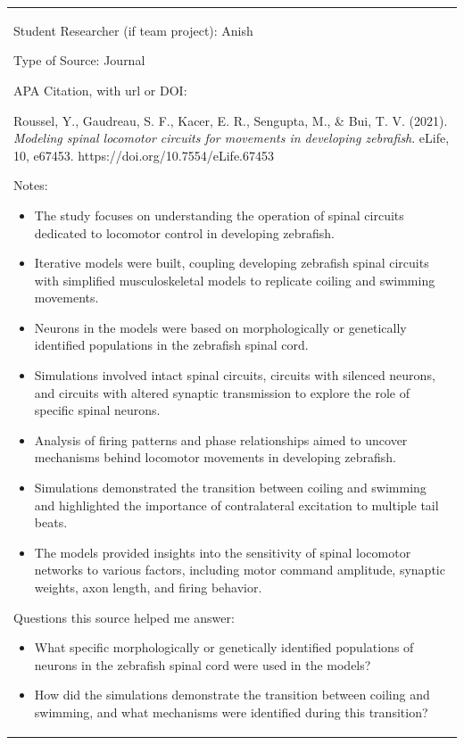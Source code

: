 \begin{longtable}[]{@{}
  >{\raggedright\arraybackslash}p{}@{}}
\toprule\noalign{}

Student Researcher (if team project): Anish


Type of Source: Journal


APA Citation, with url or DOI:

Roussel, Y., Gaudreau, S. F., Kacer, E. R., Sengupta, M., \& Bui, T. V.
(2021). \emph{Modeling spinal locomotor circuits for movements in
developing zebrafish}. eLife, 10, e67453.
https://doi.org/10.7554/eLife.67453


Notes:

\begin{itemize}
\item
  The study focuses on understanding the operation of spinal circuits
  dedicated to locomotor control in developing zebrafish.
\item
  Iterative models were built, coupling developing zebrafish spinal
  circuits with simplified musculoskeletal models to replicate coiling
  and swimming movements.
\item
  Neurons in the models were based on morphologically or genetically
  identified populations in the zebrafish spinal cord.
\item
  Simulations involved intact spinal circuits, circuits with silenced
  neurons, and circuits with altered synaptic transmission to explore
  the role of specific spinal neurons.
\item
  Analysis of firing patterns and phase relationships aimed to uncover
  mechanisms behind locomotor movements in developing zebrafish.
\item
  Simulations demonstrated the transition between coiling and swimming
  and highlighted the importance of contralateral excitation to multiple
  tail beats.
\item
  The models provided insights into the sensitivity of spinal locomotor
  networks to various factors, including motor command amplitude,
  synaptic weights, axon length, and firing behavior.
\end{itemize}


Questions this source helped me answer:

\begin{itemize}
\item
  What specific morphologically or genetically identified populations of
  neurons in the zebrafish spinal cord were used in the models?
\item
  How did the simulations demonstrate the transition between coiling and
  swimming, and what mechanisms were identified during this transition?
\end{itemize}



\end{longtable}
